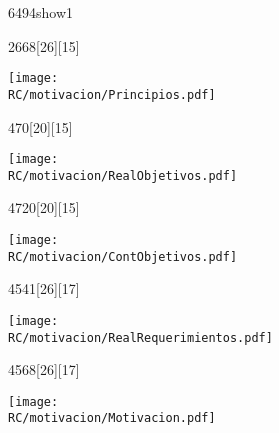 \begin{NuevaPagina}{64}{94}{show1}
	\begin{NuevoParrafo}{26}{68}[26][15]
		\begin{Marco}[\LineaSupC][\LineaInfC][\LineaIzqC][\LineaDerC][CBlanco]
			\subseccionC{\PVPri}%
			\centering\texttt{[image: \\RC/motivacion/Principios.pdf]}
		\end{Marco}
	\end{NuevoParrafo}
	
	\begin{NuevoParrafo}{47}{0}[20][15]
		\begin{Marco}[\LineaSupC][\LineaInfC][\LineaIzqC][\LineaDerC][CBlanco]
			\subseccionC{\PVROb}%
			\centering\texttt{[image: \\RC/motivacion/RealObjetivos.pdf]}
		\end{Marco}
	\end{NuevoParrafo}
	
	
	\begin{NuevoParrafo}{47}{20}[20][15]
		\begin{Marco}[\LineaSupC][\LineaInfC][\LineaIzqC][\LineaDerC][CBlanco]
			\subseccionC{\PVCOb}%
			\centering\texttt{[image: \\RC/motivacion/ContObjetivos.pdf]}
		\end{Marco}
	\end{NuevoParrafo}
	
	
	\begin{NuevoParrafo}{45}{41}[26][17]
		\begin{Marco}[\LineaSupC][\LineaInfC][\LineaIzqC][\LineaDerC][CBlanco]
			\subseccionC{\PVReR}%
			\centering\texttt{[image: \\RC/motivacion/RealRequerimientos.pdf]}
		\end{Marco}
	\end{NuevoParrafo}
	\begin{NuevoParrafo}{45}{68}[26][17]
		\begin{Marco}[\LineaSupC][\LineaInfC][\LineaIzqC][\LineaDerC][CBlanco]
			\subseccionC{\PVMot}%
			\centering\texttt{[image: \\RC/motivacion/Motivacion.pdf]}
		\end{Marco}
	\end{NuevoParrafo}

\end{NuevaPagina}